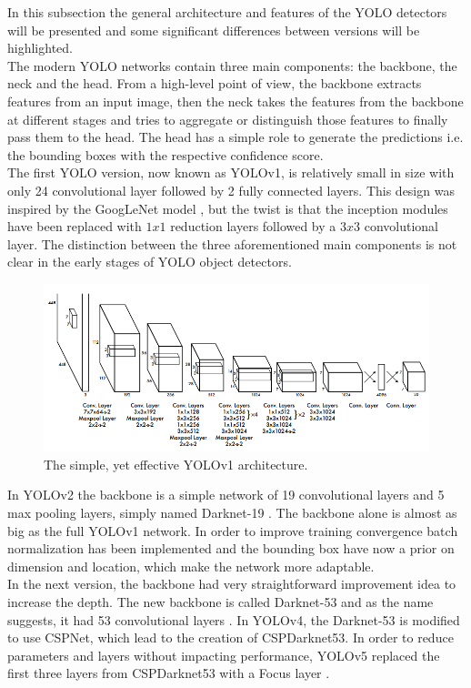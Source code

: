 In this subsection the general architecture and features of the YOLO detectors will be presented and some significant differences between versions will be highlighted. \\
The modern YOLO networks contain three main components: the backbone, the neck and the head. From a high-level point of view, the backbone extracts features from an input image, then the neck takes the features from the backbone at different stages and tries to aggregate or distinguish those features to finally pass them to the head. The head has a simple role to generate the predictions i.e. the bounding boxes with the respective confidence score. \\
The first YOLO version, now known as YOLOv1, is relatively small in size with only 24 convolutional layer followed by 2 fully connected layers. This design was inspired by the GoogLeNet model \cite{googlenet_paper}, but the twist is that the inception modules have been replaced with $1x1$ reduction layers followed by a $3x3$ convolutional layer. The distinction between the three aforementioned main components is not clear in the early stages of YOLO object detectors.

\begin{figure}[!h]
\centering
\captionsetup{justification=centering,margin=2cm}
\includegraphics[width=0.8\columnwidth]{images/detection/yolov1_arch}
\caption{The simple, yet effective YOLOv1 architecture.\cite{yolov1_paper}}
\label{detection:yolov1_arch}
\end{figure}


In YOLOv2 the backbone is a simple network of 19 convolutional layers and 5 max pooling layers, simply named Darknet-19 \cite{yolov2_paper}. The backbone alone is almost as big as the full YOLOv1 network. In order to improve training convergence batch normalization has been implemented and the bounding box have now a prior on dimension and location, which make the network more adaptable. \\
 In the next  version, the backbone had very straightforward improvement idea to increase the depth. The new backbone is called Darknet-53 and as the name suggests, it had 53 convolutional layers \cite{yolov3_paper}. In YOLOv4, the Darknet-53 is modified to use CSPNet, which lead to the creation of CSPDarknet53. In order to reduce parameters and layers without impacting performance, YOLOv5 replaced the first three layers from CSPDarknet53 with a Focus layer \cite{yolov5_focus}. \\

